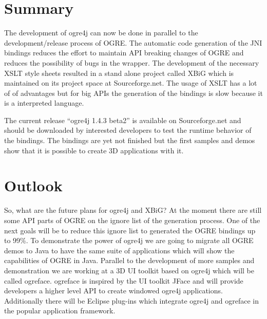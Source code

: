 \section{Summary}
\label{sec:Summary}
The development of ogre4j can now be done in parallel to the 
development/release process of OGRE. The automatic code generation of the JNI 
bindings reduces the effort to maintain API breaking changes of OGRE and 
reduces the possibility of bugs in the wrapper. The development of the 
necessary XSLT style sheets resulted in a stand alone project called XBiG which 
is maintained on its project space at Sourceforge.net. The usage of XSLT has a 
lot of of advantages but for big APIs the generation of the bindings is slow 
because it is a interpreted language.

The current release ``ogre4j 1.4.3 beta2'' is available on Sourceforge.net and
should be downloaded by interested developers to test the runtime behavior of
the bindings. The bindings are yet not finished but the first samples and
demos show that it is possible to create 3D applications with it. 

\section{Outlook}
\label{sec:Outlook}
So, what are the future plans for ogre4j and XBiG? At the moment there are 
still some API parts of OGRE on the ignore list of the generation process. One 
of the next goals will be to reduce this ignore list to generated the OGRE 
bindings up to 99\%. To demonstrate the power of ogre4j we are going to migrate 
all OGRE demos to Java to have the same suite of applications which will show 
the capabilities of OGRE in Java. Parallel to the development of more samples 
and demonstration we are working at a 3D UI toolkit based on ogre4j which will 
be called ogreface. ogreface is inspired by the UI toolkit JFace and will 
provide developers a higher level API to create windowed ogre4j applications. 
Additionally there will be Eclipse plug-ins which integrate ogre4j and ogreface 
in the popular application framework.

